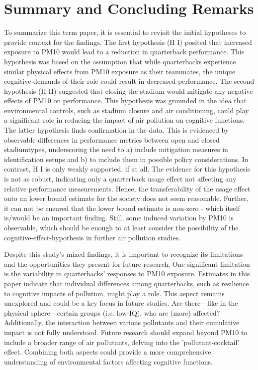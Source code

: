 \documentclass[12pt,a4paper]{article}
\begin{document}
{\section{Summary and Concluding Remarks}
\label{6}
To summarize this term paper, it is essential to revisit the initial hypotheses to provide context for the findings. The first hypothesis (H I) posited that increased exposure to PM10 would lead to a reduction in quarterback performance. This hypothesis was based on the assumption that while quarterbacks experience similar physical effects from PM10 exposure as their teammates, the unique cognitive demands of their role could result in decreased performance. The second hypothesis (H II) suggested that closing the stadium would mitigate any negative effects of PM10 on performance. This hypothesis was grounded in the idea that environmental controls, such as stadium closure and air conditioning, could play a significant role in reducing the impact of air pollution on cognitive functions. The latter hypothesis finds confirmation in the data. This is evidenced by observable differences in performance metrics between open and closed stadiumtypes, underscoring the need to a) include mitigation measures in identification setups and b) to include them in possible policy considerations. In contrast, H I is only weakly supported, if at all. The evidence for this hypothesis is not as robust, indicating only a quarterback usage effect not affecting any relative performance measurements. Hence, the transferability of the usage effect onto an lower bound estimate for the society does not seem reasonable. Further, it can not be ensured that the lower bound estimate is non-zero - which itself is/would be an important finding. Still, some induced variation by PM10 is observable, which should be enough to at least consider the possibility of the cognitive-effect-hypothesis in further air pollution studies. 


Despite this study's mixed findings, it is important to recognize its limitations and the opportunities they present for future research. One significant limitation is the variability in quarterbacks' responses to PM10 exposure. Estimates in this paper indicate that individual differences among quarterbacks, such as resilience to cognitive impacts of pollution, might play a role. This aspect remains unexplored and could be a key focus in future studies. Are there - like in the physical sphere - certain groups (i.e. low-IQ), who are (more) affected? Additionally, the interaction between various pollutants and their cumulative impact is not fully understood. Future research should expand beyond PM10 to include a broader range of air pollutants, delving into the 'pollutant-cocktail' effect. Combining both aspects could provide a more comprehensive understanding of environmental factors affecting cognitive functions.

}
\end{document}

